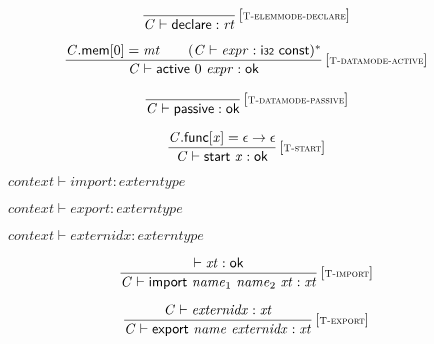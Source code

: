 $$
\begin{array}{@{}c@{}}\displaystyle
\frac{
}{
{\mathit{C}} \vdash \mathsf{declare} : {\mathit{rt}}
} \, {[\textsc{\scriptsize T{-}elemmode{-}declare}]}
\qquad
\end{array}
$$

$$
\begin{array}{@{}c@{}}\displaystyle
\frac{
{\mathit{C}}.\mathsf{mem}{}[0] = {\mathit{mt}}
 \qquad
({\mathit{C}} \vdash {\mathit{expr}} : \mathsf{i{\scriptstyle32}}~\mathsf{const})^\ast
}{
{\mathit{C}} \vdash \mathsf{active}~0~{\mathit{expr}} : \mathsf{ok}
} \, {[\textsc{\scriptsize T{-}datamode{-}active}]}
\qquad
\end{array}
$$

$$
\begin{array}{@{}c@{}}\displaystyle
\frac{
}{
{\mathit{C}} \vdash \mathsf{passive} : \mathsf{ok}
} \, {[\textsc{\scriptsize T{-}datamode{-}passive}]}
\qquad
\end{array}
$$

$$
\begin{array}{@{}c@{}}\displaystyle
\frac{
{\mathit{C}}.\mathsf{func}{}[{\mathit{x}}] = \epsilon \rightarrow \epsilon
}{
{\mathit{C}} \vdash \mathsf{start}~{\mathit{x}} : \mathsf{ok}
} \, {[\textsc{\scriptsize T{-}start}]}
\qquad
\end{array}
$$

\vspace{1ex}

$\boxed{{\mathit{context}} \vdash {\mathit{import}} : {\mathit{externtype}}}$

$\boxed{{\mathit{context}} \vdash {\mathit{export}} : {\mathit{externtype}}}$

$\boxed{{\mathit{context}} \vdash {\mathit{externidx}} : {\mathit{externtype}}}$

$$
\begin{array}{@{}c@{}}\displaystyle
\frac{
{ \vdash }\;{\mathit{xt}} : \mathsf{ok}
}{
{\mathit{C}} \vdash \mathsf{import}~{\mathit{name}}_{{1}}~{\mathit{name}}_{{2}}~{\mathit{xt}} : {\mathit{xt}}
} \, {[\textsc{\scriptsize T{-}import}]}
\qquad
\end{array}
$$

$$
\begin{array}{@{}c@{}}\displaystyle
\frac{
{\mathit{C}} \vdash {\mathit{externidx}} : {\mathit{xt}}
}{
{\mathit{C}} \vdash \mathsf{export}~{\mathit{name}}~{\mathit{externidx}} : {\mathit{xt}}
} \, {[\textsc{\scriptsize T{-}export}]}
\qquad
\end{array}
$$


